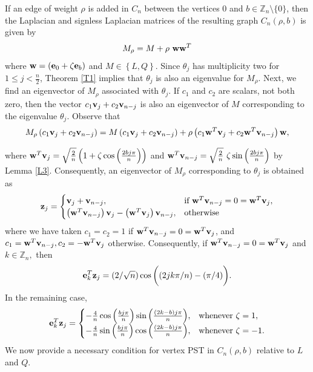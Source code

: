 \documentclass[12pt,a4paper]{article}
\def \e {{\mathbf e}}
\def \z {{\bf z}}
\def \w {{\bf w}}
\def \v {{\bf v}}
\newcommand{\ob}[1]{\left(#1\right)}
\newcommand{\cb}[1]{\left\lbrace #1\right\rbrace}
\begin{document}
If an edge of weight $\rho$ is added in $C_n$ between the vertices $0$ and $b\in \mathbb{Z}_n\setminus \{0\}$, then the Laplacian and signless Laplacian matrices of the resulting graph $C_n (\rho, b)$ is given by 
\begin{equation*}
M_{\rho}=M+\rho~\w\w^T
\end{equation*}
where $\w=\ob{\e_0+\zeta\e_b}$ and $M\in\cb{L, Q}.$ Since $\theta_j$ has multiplicity two for $1 \leq j < \frac{n}{2}$, Theorem \ref{T1} implies that $\theta_j$ is also an eigenvalue for $M_\rho$. Next, we find an eigenvector of $M_\rho$ associated with $\theta_j.$ If $c_1$ and $c_2$ are scalars, not both zero, then the vector $c_1 \v_j + c_2 \v_{n-j}$ is also an eigenvector of $M$ corresponding to the eigenvalue $\theta_j$. Observe that 
\begin{equation}\label{Cycle ev}
  M_{\rho}\ob{c_1\v_j+c_2\v_{n-j}} =M\ob{c_1\v_j+c_2\v_{n-j}}+\rho\ob{c_1\w^T\v_j+c_2\w^T\v_{n-j}}\w,  
\end{equation}

where $\w^T\v_j=\sqrt{\frac{2}{n}}\ob{1+\zeta\cos\ob{\frac{2bj\pi}{n}}}$ and $\w^T\v_{n-j}=\sqrt{\frac{2}{n}}~\zeta \sin \ob{\frac{2bj\pi}{n}}$ by Lemma \ref{L3}. Consequently, an eigenvector of $M_{\rho}$ corresponding to $\theta_j$ is obtained as
\[\z_j=\begin{cases}
\v_j+\v_{n-j},& \text{if }\w^T\v_{n-j}= 0 =\w^T\v_j,\\
\ob{\w^T\v_{n-j}}\v_j- \ob{\w^T\v_j}\v_{n-j},& \text{otherwise}
\end{cases}
\]
where we have taken $c_1=c_2=1$ if $\w^T\v_{n-j}= 0 =\w^T\v_j$, and $c_1=\w^T\v_{n-j}, c_2=-\w^T\v_{j}$ otherwise. Consequently, if $\w^T\v_{n-j}= 0 =\w^T\v_j$ and $k \in \mathbb{Z}_n,$ then
\begin{equation}\label{E5}
  \e_k^T \z_j= (2/\sqrt{n}) \cos{\bigg( (2jk\pi/n)-(\pi/4)\bigg)}. 
\end{equation}
In the remaining case,
\begin{equation}\label{E6}
\e_k^T\z_j=\begin{cases}
-\frac{4}{n} \cos{\left( \frac{bj\pi}{n} \right)} \sin{\left( \frac{(2k - b)j\pi}{n} \right)}, & \text{whenever } \zeta = 1, \\
-\frac{4}{n} \sin{\left( \frac{bj\pi}{n} \right)} \cos{\left( \frac{(2k - b)j\pi}{n} \right)}, & \text{whenever } \zeta = -1.
\end{cases}
\end{equation}
We now provide a necessary condition for vertex PST in $C_n (\rho, b)$ relative to $L$ and $Q$.
\end{document}
